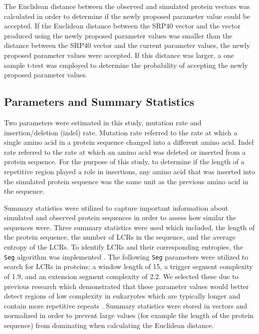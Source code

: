 \documentclass{article}
\begin{document}
The Euclidean distance between the observed and simulated protein vectors was calculated in order to determine if the newly proposed parameter value could be accepted. If the Euclidean distance between the SRP40 vector and the vector produced using the newly proposed parameter values was smaller than the distance between the SRP40 vector and the current parameter values, the newly proposed parameter values were accepted. If this distance was larger, a one sample t-test was employed to determine the probability of accepting the newly proposed parameter values.

\subsection{Parameters and Summary Statistics}

Two parameters were estimated in this study, mutation rate and insertion/deletion (indel) rate. Mutation rate referred to the rate at which a single amino acid in a protein sequence changed into a different amino acid. Indel rate referred to the rate at which an amino acid was deleted or inserted from a protein sequence. For the purpose of this study, to determine if the length of a repetitive region played a role in insertions, any amino acid that was inserted into the simulated protein sequence was the same unit as the previous amino acid in the sequence.

Summary statistics were utilized to capture important information about simulated and observed protein sequences in order to assess how similar the sequences were. Three summary statistics were used which included, the length of the protein sequence, the number of LCRs in the sequence, and the average entropy of the LCRs. To identify LCRs and their corresponding entropies, the \texttt{Seg} algorithm was implemented \citep{wootton1993statistics}. The following \texttt{Seg} parameters were utilized to search for LCRs in proteins; a window length of 15, a trigger segment complexity of 1.9, and an extension segment complexity of 2.2. We selected these due to previous research which demonstrated that these parameter values would better detect regions of low complexity in eukaryotes which are typically longer and contain more repetitive repeats \citep{huntley2000evolution}. Summary statistics were stored in vectors and normalized in order to prevent large values (for example the length of the protein sequence) from dominating when calculating the Euclidean distance.
\end{document}

